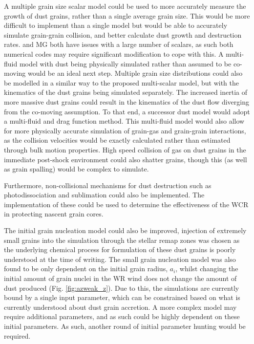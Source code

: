 A multiple grain size scalar model could be used to more accurately measure the growth of dust grains, rather than a single average grain size.
This would be more difficult to implement than a single model but would be able to accurately simulate grain-grain collision, and better calculate dust growth and destruction rates.
\athena{} and MG both have issues with a large number of scalars, as such both numerical codes may require significant modification to cope with this.
A multi-fluid model with dust being physically simulated rather than assumed to be co-moving would be an ideal next step.
Multiple grain size distributions could also be modelled in a similar way to the proposed multi-scalar model, but with the kinematics of the dust grains being simulated separately.
The increased inertia of more massive dust grains could result in the kinematics of the dust flow diverging from the co-moving assumption.
To that end, a successor dust model would adopt a multi-fluid and drag function method.
This multi-fluid model would also allow for more physically accurate simulation of grain-gas and grain-grain interactions, as the collision velocities would be exactly calculated rather than estimated through bulk motion properties.
High speed collision of gas on dust grains in the immediate post-shock environment could also shatter grains, though this (as well as grain spalling) would be complex to simulate. 

Furthermore, non-collisional mechanisms for dust destruction such as photodissociation and sublimation could also be implemented.
The implementation of these could be used to determine the effectiveness of the WCR in protecting nascent grain cores.


The initial grain nucleation model could also be improved, injection of extremely small grains into the simulation through the stellar remap zones was chosen as the underlying chemical process for formulation of these dust grains is poorly understood at the time of writing.
The small grain nucleation model was also found to be only dependent on the initial grain radius, $a_i$, whilst changing the initial amount of grain nuclei in the WR wind does not change the amount of dust produced (Fig. \ref{fig:azweak_z}).
Due to this, the simulations are currently bound by a single input parameter, which can be constrained based on what is currently understood about dust grain accretion.
A more complex model may require additional parameters, and as such could be highly dependent on these initial parameters. As such, another round of initial parameter hunting would be required.

